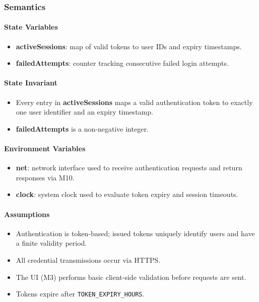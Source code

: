 \documentclass[12pt, titlepage]{article}
\begin{document}
\subsubsection{Semantics}

\paragraph{State Variables}
\begin{itemize}
  \item \textbf{activeSessions}: map of valid tokens to user IDs and expiry timestamps.
  \item \textbf{failedAttempts}: counter tracking consecutive failed login attempts.
\end{itemize}

\paragraph{State Invariant}
\begin{itemize}
  \item Every entry in \textbf{activeSessions} maps a valid authentication token
        to exactly one user identifier and an expiry timestamp.
  \item \textbf{failedAttempts} is a non-negative integer.
\end{itemize}


\paragraph{Environment Variables}
\begin{itemize}
  \item \textbf{net}: network interface used to receive authentication requests
        and return responses via M10.
  \item \textbf{clock}: system clock used to evaluate token expiry and session timeouts.
\end{itemize}


\paragraph{Assumptions}
\begin{itemize}
  \item Authentication is token-based; issued tokens uniquely identify users and
      have a finite validity period.
  \item All credential transmissions occur via HTTPS.
  \item The UI (M3) performs basic client-side validation before requests are sent.
  \item Tokens expire after \texttt{TOKEN\_EXPIRY\_HOURS}.
\end{itemize}
\end{document}
